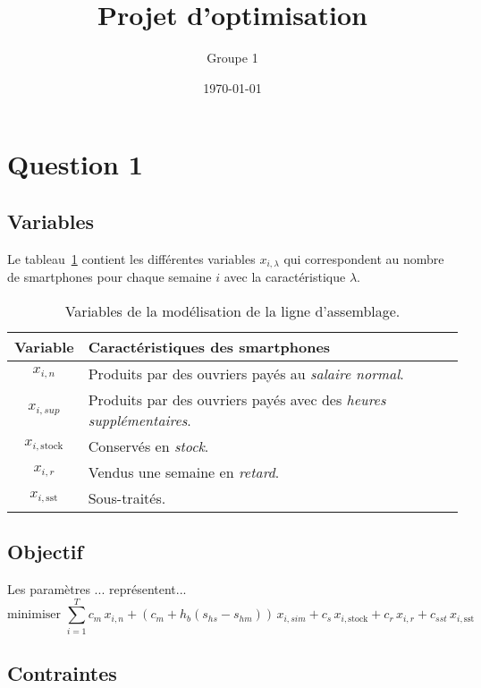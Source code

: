 \documentclass[12pt,oneside,a4paper]{article}
\title{Projet d'optimisation}
\author{Groupe 1}
\date{\today}
\begin{document}
\maketitle

\section{Question 1}

\subsection*{Variables}

Le tableau~\ref{tab:variablesQuestion1} contient les différentes variables $x_{i,\lambda}$
qui correspondent au nombre de smartphones pour chaque semaine $i$
avec la caractéristique $\lambda$.
 
\begin{table}
  \begin{center}
  \begin{tabular}{|c|l|}
    \hline
    Variable & Caractéristiques des smartphones \\
    \hline
    \hline
    $x_{i,n}$ & Produits par des ouvriers payés au \emph{salaire normal}. \\
    \hline
    $x_{i,sup}$ & Produits par des ouvriers payés avec des \emph{heures supplémentaires}. \\
    \hline
    $x_{i,\text{stock}}$ & Conservés en \emph{stock}. \\
    \hline
    $x_{i,r}$ & Vendus une semaine en \emph{retard}. \\
    \hline
    $x_{i,\text{sst}}$ & Sous-traités. \\
    \hline
  \end{tabular}
  \caption{Variables de la modélisation de la ligne d'assemblage.}
  \label{tab:variablesQuestion1}
  \end{center}
\end{table}

\subsection*{Objectif}
Les paramètres ... représentent...
\[
  \mbox{minimiser } 
  \sum_{i=1}^{T} c_m\, x_{i,n} + (c_m + h_b (s_{hs} - s_{hm}))\, x_{i,sim}
  + c_s\, x_{i,\text{stock}} + c_r\, x_{i,r} + c_{sst}\, x_{i,\text{sst}}
\]

\subsection*{Contraintes}
\end{document}
